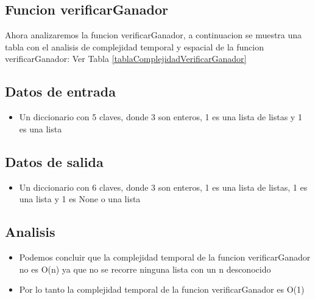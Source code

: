 \documentclass[10pt,twocolumn]{article}
\begin{document}




\subsection{Funcion verificarGanador}

Ahora analizaremos la funcion verificarGanador, a continuacion se muestra una tabla con el analisis de complejidad temporal y espacial de la funcion verificarGanador:
Ver Tabla \ref{tablaComplejidadVerificarGanador}

\subsection{Datos de entrada}
\begin{itemize}
\item Un diccionario con 5 claves, donde 3 son enteros, 1 es una lista de listas y 1 es una lista
\end{itemize}

\subsection{Datos de salida}
\begin{itemize}
\item Un diccionario con 6 claves, donde 3 son enteros, 1 es una lista de listas, 1 es una lista y 1 es None o una lista
\end{itemize}

\subsection{Analisis}
\begin{itemize}
\item Podemos concluir que la complejidad temporal de la funcion verificarGanador no es O(n) ya que no se recorre ninguna lista con un n desconocido
\item Por lo tanto la complejidad temporal de la funcion verificarGanador es O(1)
\end{itemize}
\end{document}
